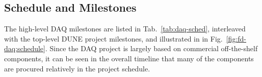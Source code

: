 


\subsection{Schedule and Milestones}
\label{sec:fd-daq:schedule}

The high-level DAQ milestones are listed in Tab.~\ref{tab:daq-sched}, interleaved with the top-level DUNE project milestones, and illustrated in in Fig.~\ref{fig:fd-daq:schedule}. Since the DAQ project is largely based on commercial off-the-shelf components, it can be seen in the overall timeline that many of the components are procured relatively in the project schedule.

